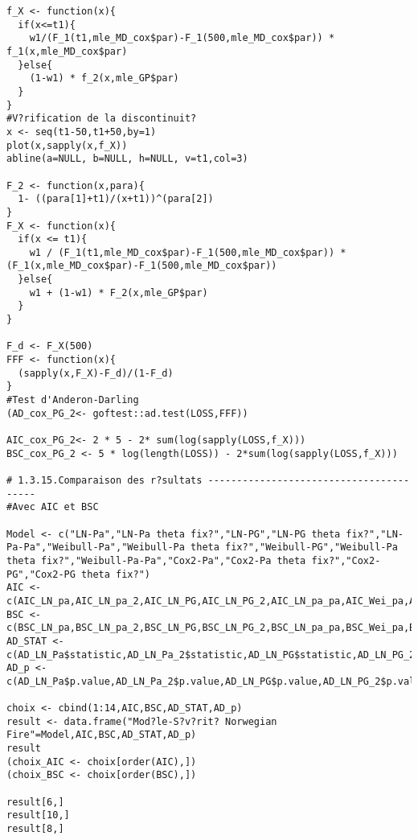 \begin{verbatim}
f_X <- function(x){
  if(x<=t1){
    w1/(F_1(t1,mle_MD_cox$par)-F_1(500,mle_MD_cox$par)) * f_1(x,mle_MD_cox$par)
  }else{
    (1-w1) * f_2(x,mle_GP$par)
  }
}
#V?rification de la discontinuit?
x <- seq(t1-50,t1+50,by=1)
plot(x,sapply(x,f_X))
abline(a=NULL, b=NULL, h=NULL, v=t1,col=3)

F_2 <- function(x,para){
  1- ((para[1]+t1)/(x+t1))^(para[2])
}
F_X <- function(x){
  if(x <= t1){
    w1 / (F_1(t1,mle_MD_cox$par)-F_1(500,mle_MD_cox$par)) * (F_1(x,mle_MD_cox$par)-F_1(500,mle_MD_cox$par))
  }else{
    w1 + (1-w1) * F_2(x,mle_GP$par)
  }
}

F_d <- F_X(500)
FFF <- function(x){
  (sapply(x,F_X)-F_d)/(1-F_d)
}
#Test d'Anderon-Darling
(AD_cox_PG_2<- goftest::ad.test(LOSS,FFF))

AIC_cox_PG_2<- 2 * 5 - 2* sum(log(sapply(LOSS,f_X)))
BSC_cox_PG_2 <- 5 * log(length(LOSS)) - 2*sum(log(sapply(LOSS,f_X)))

# 1.3.15.Comparaison des r?sultats ----------------------------------------
#Avec AIC et BSC

Model <- c("LN-Pa","LN-Pa theta fix?","LN-PG","LN-PG theta fix?","LN-Pa-Pa","Weibull-Pa","Weibull-Pa theta fix?","Weibull-PG","Weibull-Pa theta fix?","Weibull-Pa-Pa","Cox2-Pa","Cox2-Pa theta fix?","Cox2-PG","Cox2-PG theta fix?")
AIC <- c(AIC_LN_pa,AIC_LN_pa_2,AIC_LN_PG,AIC_LN_PG_2,AIC_LN_pa_pa,AIC_Wei_pa,AIC_Wei_pa_2,AIC_Wei_PG,AIC_Wei_PG_2,AIC_Wei_pa_pa,AIC_cox_pa,AIC_cox_pa_2,AIC_cox_PG,AIC_cox_PG_2)
BSC <- c(BSC_LN_pa,BSC_LN_pa_2,BSC_LN_PG,BSC_LN_PG_2,BSC_LN_pa_pa,BSC_Wei_pa,BSC_Wei_pa_2,BSC_Wei_PG,BSC_Wei_PG_2,BSC_Wei_pa_pa,BSC_cox_pa,BSC_cox_pa_2,BSC_cox_PG,BSC_cox_PG_2)
AD_STAT <-  c(AD_LN_Pa$statistic,AD_LN_Pa_2$statistic,AD_LN_PG$statistic,AD_LN_PG_2$statistic,AD_LN_Pa_Pa$statistic,AD_Wei_Pa$statistic,AD_Wei_Pa_2$statistic,AD_Wei_PG$statistic,AD_Wei_PG_2$statistic,AD_Wei_Pa_Pa$statistic,AD_cox_pa$statistic,AD_cox_pa_2$statistic,AD_cox_PG$statistic,AD_cox_PG_2$statistic) 
AD_p <- c(AD_LN_Pa$p.value,AD_LN_Pa_2$p.value,AD_LN_PG$p.value,AD_LN_PG_2$p.value,AD_LN_Pa_Pa$p.value,AD_Wei_Pa$p.value,AD_Wei_Pa_2$p.value,AD_Wei_PG$p.value,AD_Wei_PG_2$p.value,AD_Wei_Pa_Pa$p.value,AD_cox_pa$p.value,AD_cox_pa_2$p.value,AD_cox_PG$p.value,AD_cox_PG_2$p.value)

choix <- cbind(1:14,AIC,BSC,AD_STAT,AD_p)
result <- data.frame("Mod?le-S?v?rit? Norwegian Fire"=Model,AIC,BSC,AD_STAT,AD_p)
result
(choix_AIC <- choix[order(AIC),])
(choix_BSC <- choix[order(BSC),])

result[6,]
result[10,]
result[8,]


\end{verbatim}
